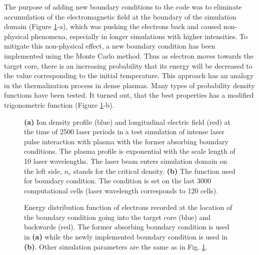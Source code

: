 The purpose of adding new boundary conditions to the code was to eliminate accumulation of the electromagnetic field at the boundary of the simulation domain (Figure \ref{fig:bc1}-a), which was pushing the electrons back and caused non-physical phenomena, especially in longer simulations with higher intensities. To mitigate this non-physical effect, a new boundary condition has been implemented using the Monte Carlo method. Thus as electron moves towards the target core, there is an increasing probability that its energy will be decreased to the value corresponding to the initial temperature. This approach has an analogy in the thermalization process in dense plasmas. Many types of probability density functions have been tested. It turned out, that the best properties has a modified trigonometric function (Figure \ref{fig:bc1}-b).

\begin{figure}[h!]
	\centering
	\caption{\textbf{(a)} Ion density profile (blue) and longitudinal electric field (red) at the time of 2500 laser periods in a test simulation of intense laser pulse interaction with plasma with the former absorbing boundary conditions. The plasma profile is exponential with the scale length of 10 laser wavelengths. The laser beam enters simulation domain on the left side, $ n_c $ stands for the critical density. \textbf{(b)} The function used for boundary condition. The condition is set on the last 3000 computational cells (laser wavelength corresponds to 120 cells).}%
	\label{fig:bc1}%
\end{figure}
	
\begin{figure}[h!]
	\centering
	\caption{Energy distribution function of electrons recorded at the location of the boundary condition going into the target core (blue) and backwards (red). The former absorbing boundary condition is used in \textbf{(a)} while the newly implemented boundary condition is used in \textbf{(b)}. Other simulation parameters are the same as in Fig. \ref{fig:bc1}.}%
	\label{fig:bc2}%
\end{figure}

